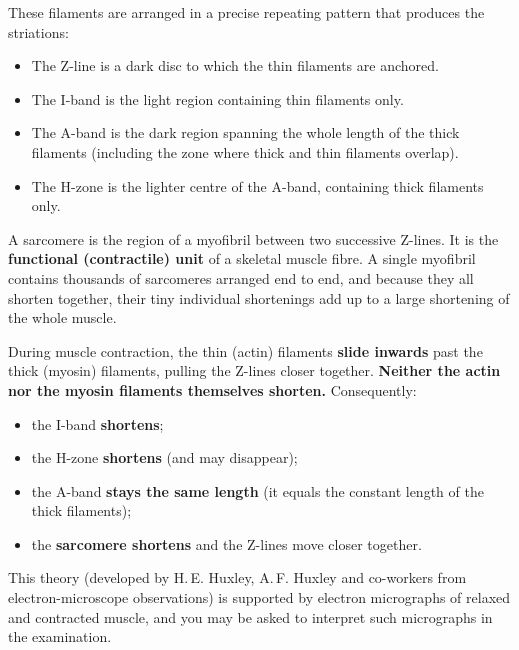 \documentclass[11pt]{article}
\newcommand{\cle}[1]{{\popxbold\color{popdark}#1}}
\newcounter{popsec}
\newcounter{popsub}
\newcommand{\courssub}[1]{%
  \stepcounter{popsub}%
  \par\vspace{9pt}\noindent{\popxbold\fontsize{11.5}{13}\selectfont\color{popink}{\color{poporange}\thepopsec.\thepopsub}\hspace{6pt}#1}\par\nopagebreak\vspace{4pt}
}
\begin{document}
These filaments are arranged in a precise repeating pattern that produces the striations:

\begin{itemize}
\item The \cle{Z-line} is a dark disc to which the thin filaments are anchored.
\item The \cle{I-band} is the light region containing thin filaments only.
\item The \cle{A-band} is the dark region spanning the whole length of the thick filaments (including the zone where thick and thin filaments overlap).
\item The \cle{H-zone} is the lighter centre of the A-band, containing thick filaments only.
\end{itemize}

\begin{definition}
A \cle{sarcomere} is the region of a myofibril between two successive \cle{Z-lines}. It is the \textbf{functional (contractile) unit} of a skeletal muscle fibre. A single myofibril contains thousands of sarcomeres arranged end to end, and because they all shorten together, their tiny individual shortenings add up to a large shortening of the whole muscle.
\end{definition}

\courssub{The sliding filament theory}

\begin{propriete}
During muscle contraction, the thin (actin) filaments \textbf{slide inwards} past the thick (myosin) filaments, pulling the Z-lines closer together. \textbf{Neither the actin nor the myosin filaments themselves shorten.} Consequently:
\begin{itemize}
\item the \cle{I-band} \textbf{shortens};
\item the \cle{H-zone} \textbf{shortens} (and may disappear);
\item the \cle{A-band} \textbf{stays the same length} (it equals the constant length of the thick filaments);
\item the \textbf{sarcomere shortens} and the Z-lines move closer together.
\end{itemize}
This theory (developed by H.\,E. Huxley, A.\,F. Huxley and co-workers from electron-microscope observations) is supported by electron micrographs of relaxed and contracted muscle, and you may be asked to interpret such micrographs in the examination.
\end{propriete}
\end{document}
